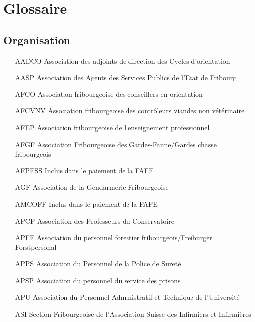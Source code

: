 \chapter{Glossaire}
\section{Organisation}%
\begin{enumerate}
\item[AADCO]
	Association des adjoints de direction des Cycles d'orientation

\item[AASP]
	Association des Agents des Services Publics de l'Etat de Fribourg

\item[AFCO]
	Association fribourgeoise des conseillers en orientation

\item[AFCVNV]
	Association fribourgeoise des contrôleurs viandes non
	vétérinaire

\item[AFEP]
	Association fribourgeoise de l'enseignement professionnel

\item[AFGF]
	Association Fribourgeoise des Gardes-Faune/Gardes chasse
	fribourgeois

\item[AFPESS]
	Inclus dans le paiement de la FAFE

\item[AGF]
	Association de la Gendarmerie Fribourgeoise

\item[AMCOFF]
	Inclus dans le paiement de la FAFE

\item[APCF]
	Association des Professeurs du Conservatoire

\item[APFF]
	Association du personnel forestier fribourgeois/Freiburger
	Forstpersonal

\item[APPS]
	Association du Personnel de la Police de Sureté

\item[APSP]
	Association du personnel du service des prisons

\item[APU]
	Association du Personnel Administratif et Technique de
	l'Université

\item[ASI]
	Section Fribourgeoise de l'Association Suisse des Infirmiers
	et Infirmières


\end{enumerate}
